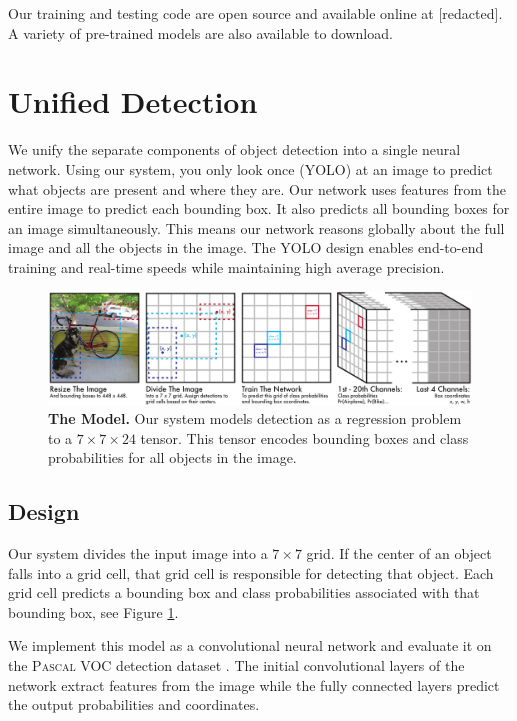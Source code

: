 \documentclass{article} %
\begin{document}
Our training and testing code are open source and available online at [redacted]. A variety of pre-trained models are also available to download.

\section{Unified Detection}

We unify the separate components of object detection into a single neural network. Using our system, you only look once (YOLO) at an image to predict what objects are present and where they are. Our network uses features from the entire image to predict each bounding box. It also predicts all bounding boxes for an image simultaneously. This means our network reasons globally about the full image and all the objects in the image. The YOLO design enables end-to-end training and real-time speeds while maintaining high average precision.

\begin{figure}[h]
\begin{center}
        \includegraphics[width=\linewidth]{full}
\end{center}
   \caption{\textbf{The Model.} Our system models detection as a regression problem to a $7 \times 7 \times 24$ tensor. This tensor encodes bounding boxes and class probabilities for all objects in the image.}
\label{model}
\end{figure}
\subsection{Design}

Our system divides the input image into a $7 \times 7$ grid. If the center of an object falls into a grid cell, that grid cell is responsible for detecting that object. Each grid cell predicts a bounding box and class probabilities associated with that bounding box, see Figure \ref{model}.

We implement this model as a convolutional neural network and evaluate it on the \textsc{Pascal} VOC detection dataset \cite{Everingham15}. The initial convolutional layers of the network extract features from the image while the fully connected layers predict the output probabilities and coordinates.
\end{document}
